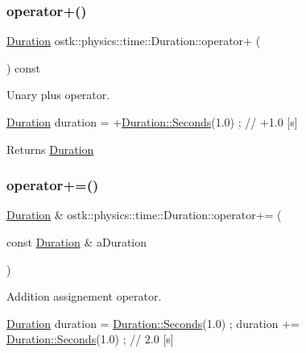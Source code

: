 \subsubsection{\texorpdfstring{operator+()}{operator+()}\hspace{0.1cm}{\footnotesize\ttfamily [2/2]}}
{\footnotesize\ttfamily \hyperlink{classostk_1_1physics_1_1time_1_1_duration}{Duration} ostk\+::physics\+::time\+::\+Duration\+::operator+ (\begin{DoxyParamCaption}{ }\end{DoxyParamCaption}) const}



Unary plus operator. 


\begin{DoxyCode}
\hyperlink{classostk_1_1physics_1_1time_1_1_duration_a6ba3a020742ca6e3bf0b1970dd039c07}{Duration} duration = +\hyperlink{classostk_1_1physics_1_1time_1_1_duration_ad973fa34fcc308fdcc8d50c3ee694764}{Duration::Seconds}(1.0) ; \textcolor{comment}{// +1.0 [s]}
\end{DoxyCode}


\begin{DoxyReturn}{Returns}
\hyperlink{classostk_1_1physics_1_1time_1_1_duration}{Duration} 
\end{DoxyReturn}
\mbox{\label{classostk_1_1physics_1_1time_1_1_duration_af0bd86fc4ec2d7a59219b3c72f699892}} 
\subsubsection{\texorpdfstring{operator+=()}{operator+=()}}
{\footnotesize\ttfamily \hyperlink{classostk_1_1physics_1_1time_1_1_duration}{Duration} \& ostk\+::physics\+::time\+::\+Duration\+::operator+= (\begin{DoxyParamCaption}\item[{const \hyperlink{classostk_1_1physics_1_1time_1_1_duration}{Duration} \&}]{a\+Duration }\end{DoxyParamCaption})}



Addition assignement operator. 


\begin{DoxyCode}
\hyperlink{classostk_1_1physics_1_1time_1_1_duration_a6ba3a020742ca6e3bf0b1970dd039c07}{Duration} duration = \hyperlink{classostk_1_1physics_1_1time_1_1_duration_ad973fa34fcc308fdcc8d50c3ee694764}{Duration::Seconds}(1.0) ;
duration += \hyperlink{classostk_1_1physics_1_1time_1_1_duration_ad973fa34fcc308fdcc8d50c3ee694764}{Duration::Seconds}(1.0) ; \textcolor{comment}{// 2.0 [s]}
\end{DoxyCode}



